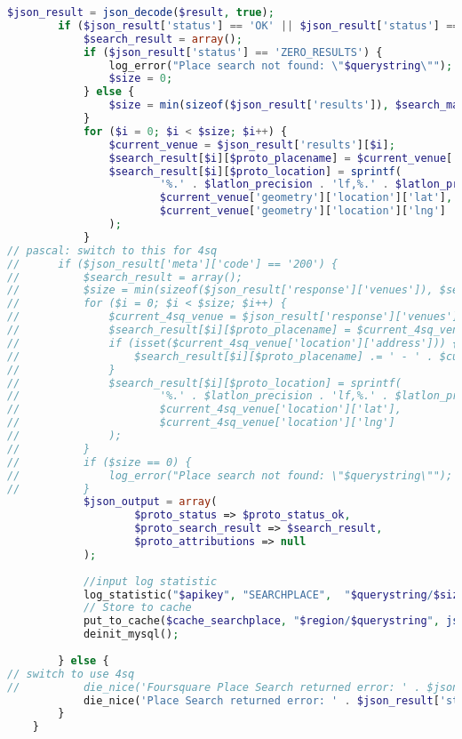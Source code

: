 \begin{lstlisting}[language=PHP,basicstyle=\tiny,caption=handle.php,label={lst:handle.php}]
		$json_result = json_decode($result, true);
		if ($json_result['status'] == 'OK' || $json_result['status'] == 'ZERO_RESULTS') {
			$search_result = array();
			if ($json_result['status'] == 'ZERO_RESULTS') {
				log_error("Place search not found: \"$querystring\"");
				$size = 0;
			} else {
				$size = min(sizeof($json_result['results']), $search_maxresult);
			}
			for ($i = 0; $i < $size; $i++) {
				$current_venue = $json_result['results'][$i];
				$search_result[$i][$proto_placename] = $current_venue['name'];
				$search_result[$i][$proto_location] = sprintf(
						'%.' . $latlon_precision . 'lf,%.' . $latlon_precision . 'lf',
						$current_venue['geometry']['location']['lat'],
						$current_venue['geometry']['location']['lng']
				);
			}
// pascal: switch to this for 4sq
// 		if ($json_result['meta']['code'] == '200') {
// 			$search_result = array();
// 			$size = min(sizeof($json_result['response']['venues']), $search_maxresult);
// 			for ($i = 0; $i < $size; $i++) {
// 				$current_4sq_venue = $json_result['response']['venues'][$i];
// 				$search_result[$i][$proto_placename] = $current_4sq_venue['name'];
// 				if (isset($current_4sq_venue['location']['address'])) {
// 					$search_result[$i][$proto_placename] .= ' - ' . $current_4sq_venue['location']['address'];
// 				}
// 				$search_result[$i][$proto_location] = sprintf(
// 						'%.' . $latlon_precision . 'lf,%.' . $latlon_precision . 'lf',
// 						$current_4sq_venue['location']['lat'],
// 						$current_4sq_venue['location']['lng']
// 				);
// 			}
// 			if ($size == 0) {
// 				log_error("Place search not found: \"$querystring\"");
// 			}
			$json_output = array(
					$proto_status => $proto_status_ok,
					$proto_search_result => $search_result,
					$proto_attributions => null
			);
	
			//input log statistic
			log_statistic("$apikey", "SEARCHPLACE",  "$querystring/$size");
			// Store to cache
			put_to_cache($cache_searchplace, "$region/$querystring", json_encode($search_result));
			deinit_mysql();
			
		} else {
// switch to use 4sq
// 			die_nice('Foursquare Place Search returned error: ' . $json_result['meta']['code'] . " (for this request: $full_url)", false);
			die_nice('Place Search returned error: ' . $json_result['status'] . " (for this request: $full_url)", false);
		}
	}
	

\end{lstlisting}
